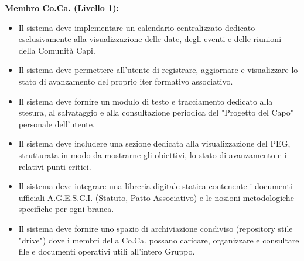 \documentclass[11pt]{article}
\numberwithin{figure}{section}
\begin{document}
\textbf{Membro Co.Ca. (Livello 1):}
\begin{itemize}[topsep=0 pt]
    \item Il sistema deve implementare un calendario centralizzato dedicato esclusivamente alla visualizzazione delle date, degli eventi e delle riunioni della Comunità Capi.
    \item Il sistema deve permettere all'utente di registrare, aggiornare e visualizzare lo stato di avanzamento del proprio iter formativo associativo.
    \item Il sistema deve fornire un modulo di testo e tracciamento dedicato alla stesura, al salvataggio e alla consultazione periodica del "Progetto del Capo" personale dell'utente.
    \item Il sistema deve includere una sezione dedicata alla visualizzazione del PEG, strutturata in modo da mostrarne gli obiettivi, lo stato di avanzamento e i relativi punti critici.
    \item Il sistema deve integrare una libreria digitale statica contenente i documenti ufficiali A.G.E.S.C.I. (Statuto, Patto Associativo) e le nozioni metodologiche specifiche per ogni branca.
    \item Il sistema deve fornire uno spazio di archiviazione condiviso (repository stile "drive") dove i membri della Co.Ca. possano caricare, organizzare e consultare file e documenti operativi utili all'intero Gruppo.
\end{itemize}

\newpage
\end{document}

